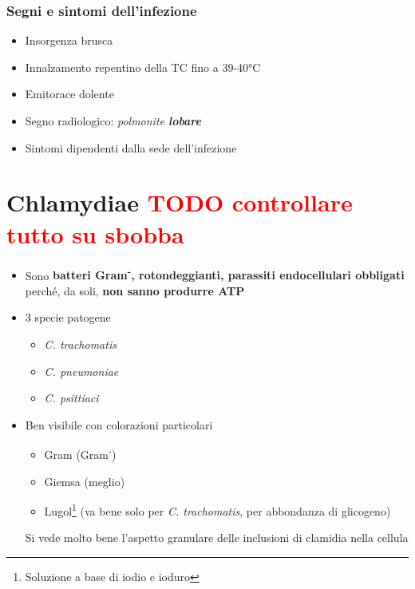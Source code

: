 \documentclass[italian,]{article}
\providecommand{\tightlist}{%
  \setlength{\itemsep}{0pt}\setlength{\parskip}{0pt}}
\newcommand{\TODO}[1]{\textcolor{red}{\textsf{\footnotesize{TODO #1}}}} %
\begin{document}
\hypertarget{segni-e-sintomi-dellinfezione}{%
\subsubsection{Segni e sintomi
dell'infezione}\label{segni-e-sintomi-dellinfezione}}

\begin{itemize}
\tightlist
\item
  Insorgenza brusca
\item
  Innalzamento repentino della TC fino a 39-40°C
\item
  Emitorace dolente
\item
  Segno radiologico: \emph{polmonite \textbf{lobare}}
\item
  Sintomi dipendenti dalla sede dell'infezione
\end{itemize}

\hypertarget{chlamydiae}{%
\section{\texorpdfstring{Chlamydiae
\TODO{controllare tutto su sbobba}}{Chlamydiae }}\label{chlamydiae}}

\begin{itemize}
\tightlist
\item
  Sono \textbf{batteri Gram\textsuperscript{-}, rotondeggianti,
  parassiti endocellulari obbligati} perché, da soli, \textbf{non sanno
  produrre ATP}
\item
  3 specie patogene

  \begin{itemize}
  \tightlist
  \item
    \emph{C. trachomatis}
  \item
    \emph{C. pneumoniae}
  \item
    \emph{C. psittiaci}
  \end{itemize}
\item
  Ben visibile con colorazioni particolari

  \begin{itemize}
  \tightlist
  \item
    Gram (Gram\textsuperscript{-})
  \item
    Giemsa (meglio)
  \item
    Lugol\footnote{Soluzione a base di iodio e ioduro} (va bene solo per
    \emph{C. trachomatis}, per abbondanza di glicogeno)
  \end{itemize}

  Si vede molto bene l'aspetto granulare delle inclusioni di clamidia
  nella cellula
\end{itemize}
\end{document}

